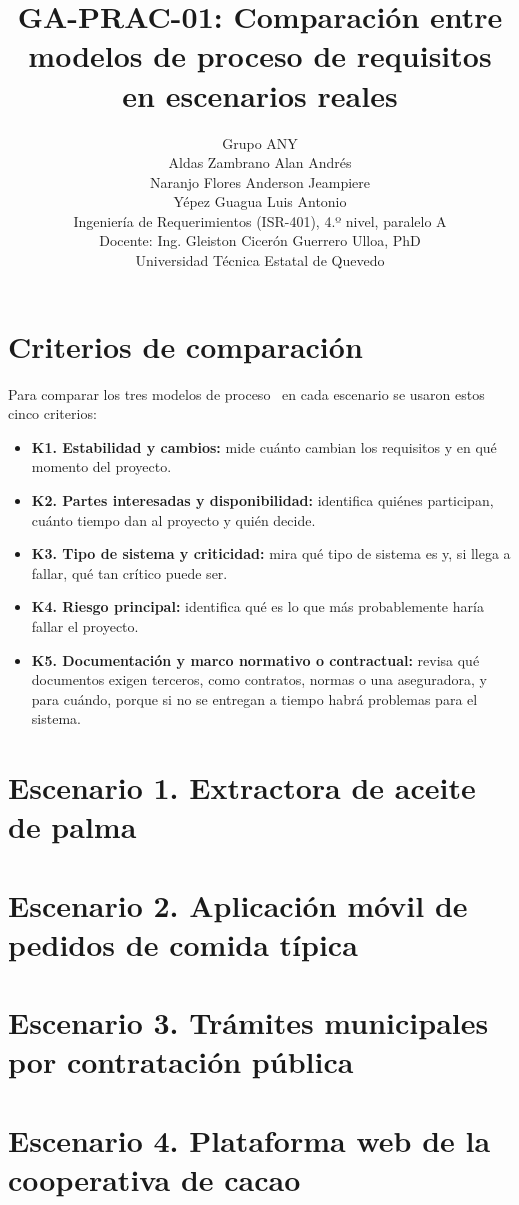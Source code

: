 \documentclass[11pt,a4paper]{article}
\title{GA-PRAC-01: Comparación entre modelos de proceso de requisitos en escenarios reales}
\author{
  Grupo ANY\\[4pt]
  Aldas Zambrano Alan Andrés\\
  Naranjo Flores Anderson Jeampiere\\
  Yépez Guagua Luis Antonio\\[6pt]
  Ingeniería de Requerimientos (ISR-401), 4.º nivel, paralelo A\\
  Docente: Ing. Gleiston Cicerón Guerrero Ulloa, PhD\\
  Universidad Técnica Estatal de Quevedo
}
\date{}
\begin{document}
\maketitle

\section{Criterios de comparación}
\label{sec:criterios}

Para comparar los tres modelos de proceso~\cite{swebok2024} en cada escenario se usaron estos cinco criterios:

\begin{itemize}
  \item \textbf{K1. Estabilidad y cambios:} mide cuánto cambian los requisitos y en qué momento del proyecto.
  \item \textbf{K2. Partes interesadas y disponibilidad:} identifica quiénes participan, cuánto tiempo dan al proyecto y quién decide.
  \item \textbf{K3. Tipo de sistema y criticidad:} mira qué tipo de sistema es y, si llega a fallar, qué tan crítico puede ser.
  \item \textbf{K4. Riesgo principal:} identifica qué es lo que más probablemente haría fallar el proyecto.
  \item \textbf{K5. Documentación y marco normativo o contractual:} revisa qué documentos exigen terceros, como contratos, normas o una aseguradora, y para cuándo, porque si no se entregan a tiempo habrá problemas para el sistema.
\end{itemize}

\clearpage
\section{Escenario 1. Extractora de aceite de palma}


\section{Escenario 2. Aplicación móvil de pedidos de comida típica}


\section{Escenario 3. Trámites municipales por contratación pública}


\section{Escenario 4. Plataforma web de la cooperativa de cacao}

\end{document}
